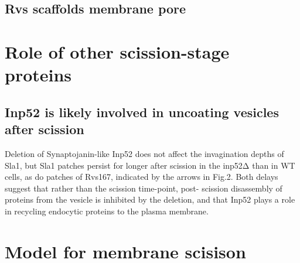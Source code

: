 \subsection{Rvs scaffolds membrane pore}



\section{Role of other scission-stage proteins}
\subsection{Inp52 is likely involved in uncoating vesicles after scission}
Deletion of Synaptojanin-like Inp52 does not affect the invagination depths of Sla1, but Sla1 patches persist for longer after scission in the inp52Δ than in WT cells, as do patches of Rvs167, indicated by the arrows in Fig.2. Both delays suggest that rather than the scission time-point, post- scission disassembly of proteins from the vesicle is inhibited by the deletion, and that Inp52 plays a role in recycling endocytic proteins to the plasma membrane.


\section{Model for membrane scisison}



